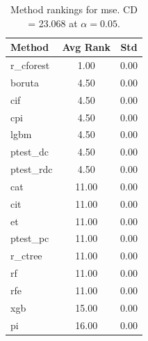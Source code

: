 \begin{table}[h]
\centering
\caption{Method rankings for mse. CD = 23.068 at $\alpha=0.05$.}
\label{tab:ranks_mse}
\begin{tabular}{lcc}
\toprule
Method & Avg Rank & Std \\
\midrule
r_cforest & 1.00 & 0.00 \\
boruta & 4.50 & 0.00 \\
cif & 4.50 & 0.00 \\
cpi & 4.50 & 0.00 \\
lgbm & 4.50 & 0.00 \\
ptest_dc & 4.50 & 0.00 \\
ptest_rdc & 4.50 & 0.00 \\
cat & 11.00 & 0.00 \\
cit & 11.00 & 0.00 \\
et & 11.00 & 0.00 \\
ptest_pc & 11.00 & 0.00 \\
r_ctree & 11.00 & 0.00 \\
rf & 11.00 & 0.00 \\
rfe & 11.00 & 0.00 \\
xgb & 15.00 & 0.00 \\
pi & 16.00 & 0.00 \\
\bottomrule
\end{tabular}
\end{table}